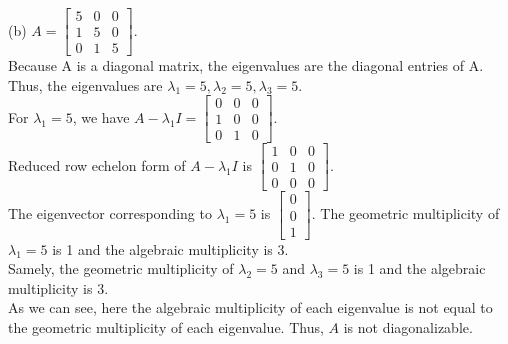 (b) $A=\begin{bmatrix} 5 & 0 & 0 \\ 1 & 5 & 0 \\ 0 & 1 & 5 \end{bmatrix}$.\\
Because A is a diagonal matrix, the eigenvalues are the diagonal entries of A. Thus, the eigenvalues are $\lambda_1 = 5, \lambda_2 = 5, \lambda_3 = 5$.\\
For $\lambda_1 = 5$, we have $A - \lambda_1 I = \begin{bmatrix} 0 & 0 & 0 \\ 1 & 0 & 0 \\ 0 & 1 & 0 \end{bmatrix}$.\\
Reduced row echelon form of $A - \lambda_1 I$ is $\begin{bmatrix} 1 & 0 & 0 \\ 0 & 1 & 0 \\ 0 & 0 & 0 \end{bmatrix}$.\\
The eigenvector corresponding to $\lambda_1 = 5$ is $\begin{bmatrix} 0 \\ 0 \\ 1 \end{bmatrix}$. The geometric multiplicity of $\lambda_1 = 5$ is 1 and the algebraic multiplicity is 3.\\
Samely, the geometric multiplicity of $\lambda_2 = 5$ and $\lambda_3 = 5$ is 1 and the algebraic multiplicity is 3.\\
As we can see, here the algebraic multiplicity of each eigenvalue is not equal to the geometric multiplicity of each eigenvalue. Thus, $A$ is not diagonalizable.\\

